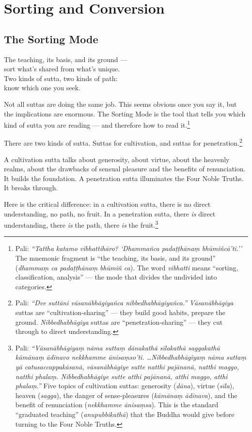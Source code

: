 \chapter{Sorting and Conversion}
\label{ch:sorting}

\section*{The Sorting Mode}

\begin{versebox}
The teaching, its basis, and its ground ---\\
sort what's shared from what's unique.\\
Two kinds of sutta, two kinds of path:\\
know which one you seek.
\end{versebox}

\noindent Not all suttas are doing the same job. This seems obvious once you say it, but the implications are enormous. The Sorting Mode is the tool that tells you which kind of sutta you are reading --- and therefore how to read it.\footnote{Pali: \textit{``Tattha katamo vibhattihāro? `Dhammañca padaṭṭhānaṃ bhūmiñcā'ti.''} The mnemonic fragment is ``the teaching, its basis, and its ground'' (\textit{dhammaṃ ca padaṭṭhānaṃ bhūmiñ ca}). The word \textit{vibhatti} means ``sorting, classification, analysis'' --- the mode that divides the undivided into categories.}

There are two kinds of sutta. Suttas for cultivation, and suttas for penetration.\footnote{Pali: \textit{``Dve suttāni vāsanābhāgiyañca nibbedhabhāgiyañca.''} \textit{Vāsanābhāgiya} suttas are ``cultivation-sharing'' --- they build good habits, prepare the ground. \textit{Nibbedhabhāgiya} suttas are ``penetration-sharing'' --- they cut through to direct understanding.}

A cultivation sutta talks about generosity, about virtue, about the heavenly realms, about the drawbacks of sensual pleasure and the benefits of renunciation. It builds the foundation. A penetration sutta illuminates the Four Noble Truths. It breaks through.

Here is the critical difference: in a cultivation sutta, there is no direct understanding, no path, no fruit. In a penetration sutta, there \textit{is} direct understanding, there \textit{is} the path, there \textit{is} the fruit.\footnote{Pali: \textit{``Vāsanābhāgiyaṃ nāma suttaṃ dānakathā sīlakathā saggakathā kāmānaṃ ādīnavo nekkhamme ānisaṃso'ti. \ldots Nibbedhabhāgiyaṃ nāma suttaṃ yā catusaccappakāsanā, vāsanābhāgiye sutte natthi pajānanā, natthi maggo, natthi phalaṃ. Nibbedhabhāgiye sutte atthi pajānanā, atthi maggo, atthi phalaṃ.''} Five topics of cultivation suttas: generosity (\textit{dāna}), virtue (\textit{sīla}), heaven (\textit{sagga}), the danger of sense-pleasures (\textit{kāmānaṃ ādīnava}), and the benefit of renunciation (\textit{nekkhamme ānisaṃsa}). This is the standard ``graduated teaching'' (\textit{anupubbikathā}) that the Buddha would give before turning to the Four Noble Truths.}

